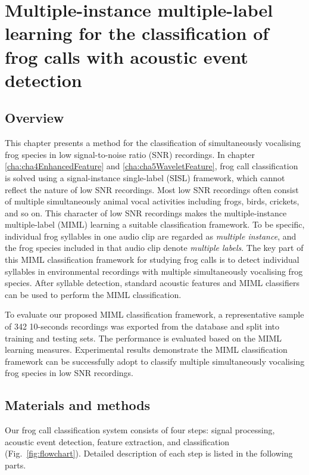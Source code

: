 
\chapter{Multiple-instance multiple-label learning for the classification of frog calls with acoustic event detection}
\label{cha:cha6MIML}


\section{Overview}
\label{sec:intro}

This chapter presents a method for the classification of simultaneously vocalising frog species in low signal-to-noise ratio (SNR) recordings. In chapter \ref{cha:cha4EnhancedFeature} and \ref{cha:cha5WaveletFeature}, frog call classification is solved using a  signal-instance single-label (SISL) framework, which cannot reflect the nature of low SNR recordings. Most low SNR recordings often consist of multiple simultaneously animal vocal activities including frogs, birds, crickets, and so on. This character of low SNR recordings makes the multiple-instance multiple-label (MIML) learning a suitable classification framework. To be specific, individual frog syllables in one audio clip are regarded as \textit{multiple instance}, and the frog species included in that audio clip denote \textit{multiple labels}. 
The key part of this MIML classification framework for studying frog calls is to detect individual syllables in environmental recordings with multiple simultaneously vocalising frog species. After syllable detection, standard acoustic features and MIML classifiers can be used to perform the MIML classification.


To evaluate our proposed MIML classification framework, a representative sample of 342 10-seconds recordings was exported from the database and split into training and testing sets. The performance is evaluated based on the MIML learning measures. Experimental results demonstrate the MIML classification framework can be successfully adopt to classify multiple simultaneously vocalising frog species in low SNR recordings.



\section{Materials and methods}
Our frog call classification system consists of
four steps: signal processing, acoustic event detection, feature
extraction, and classification (Fig.~\ref{fig:flowchart}). Detailed description of each step is listed in the following parts. 

